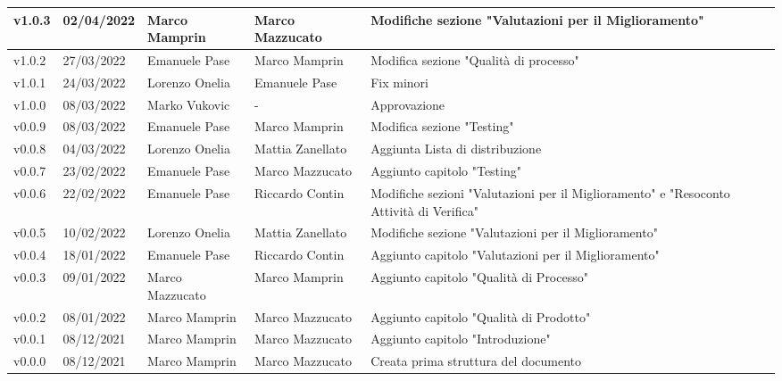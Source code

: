 {\begin{longtable}{|C{1.8cm}|C{2.1cm}|C{2cm}|C{2.4cm}|L{4.4cm}|}
  v1.0.3       & 02/04/2022    & Marco Mamprin  &   Marco Mazzucato   & Modifiche sezione "Valutazioni per il Miglioramento"                 \\ \hline
  v1.0.2       & 27/03/2022    & Emanuele Pase  & Marco Mamprin      & Modifica sezione "Qualità di processo"                   \\ \hline
  v1.0.1       & 24/03/2022    & Lorenzo Onelia  & Emanuele Pase    & Fix minori                  \\ \hline
  v1.0.0       & 08/03/2022   & Marko Vukovic & - & Approvazione     \\ \hline
  v0.0.9       & 08/03/2022    & Emanuele Pase  & Marco Mamprin         & Modifica sezione "Testing"                   \\ \hline
  v0.0.8       & 04/03/2022    & Lorenzo Onelia  & Mattia Zanellato     & Aggiunta Lista di distribuzione                  \\ \hline
  v0.0.7        & 23/02/2022    & Emanuele Pase    & Marco Mazzucato   & Aggiunto capitolo "Testing"                           \\ \hline
  v0.0.6        & 22/02/2022    & Emanuele Pase     & Riccardo Contin    & Modifiche sezioni "Valutazioni per il Miglioramento" e "Resoconto Attività di Verifica" \\ \hline
  v0.0.5        & 10/02/2022    & Lorenzo Onelia    & Mattia Zanellato   & Modifiche sezione "Valutazioni per il Miglioramento"            \\ \hline
  v0.0.4        & 18/01/2022    & Emanuele Pase     & Riccardo Contin    & Aggiunto capitolo "Valutazioni per il Miglioramento"           \\ \hline
  v0.0.3        & 09/01/2022    & Marco Mazzucato   & Marco Mamprin      & Aggiunto capitolo "Qualità di Processo"                        \\ \hline
  v0.0.2        & 08/01/2022    & Marco Mamprin     & Marco Mazzucato    & Aggiunto capitolo "Qualità di Prodotto"                        \\ \hline
  v0.0.1        & 08/12/2021    & Marco Mamprin     & Marco Mazzucato    & Aggiunto capitolo "Introduzione"                               \\ \hline
  v0.0.0        & 08/12/2021    & Marco Mamprin     & Marco Mazzucato    & Creata prima struttura del documento                           \\ \hline
\end{longtable}}

\renewcommand\arraystretch{1}
